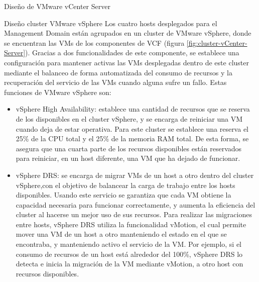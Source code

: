 \begin{subsubsection}{Diseño de VMware vCenter Server}

\end{subsubsection}

\begin{subsubsection}{Diseño cluster VMware vSphere}
\label{subsubsec:diseno-vsphere}
Los cuatro hosts desplegados para el Management Domain están agrupados en un cluster de VMware vSphere, donde se encuentran las VMs de los componentes de VCF (figura \ref{fig:cluster-vCenter-Server}). Gracias a dos funcionalidades de este componente, se establece una configuración para mantener activas las VMs desplegadas dentro de este cluster mediante el balanceo de forma automatizada del consumo de recursos y la recuperación del servicio de las VMs cuando alguna sufre un fallo. Estas funciones de VMware vSphere son:
\begin{itemize}
  \item vSphere High Availability: establece una cantidad de recursos que se reserva de los disponibles en el cluster vSphere, y se encarga de reiniciar una VM cuando deja de estar operativa. Para este cluster se establece una reserva el 25\% de la CPU total y el 25\% de la memoria RAM total. De esta forma, se asegura que una cuarta parte de los recursos disponibles están reservados para reiniciar, en un host diferente, una VM que ha dejado de funcionar.
  
  \item vSphere DRS: se encarga de migrar VMs de un host a otro dentro del cluster vSphere,con el objetivo de balancear la carga de trabajo entre los hosts disponibles. Usando este servicio se garantiza que cada VM obtiene la capacidad necesaria para funcionar correctamente, y aumenta la eficiencia del cluster al hacerse un mejor uso de sus recursos. Para realizar las migraciones entre hosts, vSphere DRS utiliza la funcionalidad vMotion, el cual permite mover una VM de un host a otro manteniendo el estado en el que se encontraba, y manteniendo activo el servicio de la VM. Por ejemplo, si el consumo de recursos de un host está alrededor del 100\%, vSphere DRS lo detecta e inicia la migración de la VM mediante vMotion, a otro host con recursos disponibles. 
\end{itemize}


\end{subsubsection}
